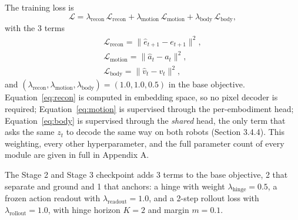 \documentclass[12pt,a4paper,oneside]{report}
\begin{document}
The training loss is
\[
\mathcal{L} = \lambda_{\text{recon}}\,\mathcal{L}_{\text{recon}} + \lambda_{\text{motion}}\,\mathcal{L}_{\text{motion}}
  + \lambda_{\text{body}}\,\mathcal{L}_{\text{body}},
\]
with the 3 terms
\begin{gather}
\mathcal{L}_{\text{recon}} = \lVert \hat{e}_{t+1} - e_{t+1} \rVert^2, \label{eq:recon}\\
\mathcal{L}_{\text{motion}} = \lVert \hat{a}_t - a_t \rVert^2, \label{eq:motion}\\
\mathcal{L}_{\text{body}} = \lVert \hat{v}_t - v_t \rVert^2, \label{eq:body}
\end{gather}
and $(\lambda_{\text{recon}}, \lambda_{\text{motion}}, \lambda_{\text{body}}) = (1.0, 1.0, 0.5)$ in the base objective. Equation~\eqref{eq:recon} is computed in embedding space, so no pixel decoder is
required; Equation~\eqref{eq:motion} is supervised through the per-embodiment head; Equation~\eqref{eq:body} is
supervised through the \emph{shared} head, the only term that asks the same $z_t$ to decode the same way on both
robots (Section 3.4.4). This weighting, every other hyperparameter, and the full parameter count of every module
are given in full in Appendix A.

The Stage 2 and Stage 3 checkpoint adds 3 terms to the base objective, 2 that separate and ground and 1 that anchors: a hinge with weight $\lambda_{\text{hinge}}=0.5$, a frozen action readout with $\lambda_{\text{readout}}=1.0$, and a 2-step rollout loss with $\lambda_{\text{rollout}}=1.0$, with hinge horizon $K=2$ and margin $m=0.1$.
\end{document}
